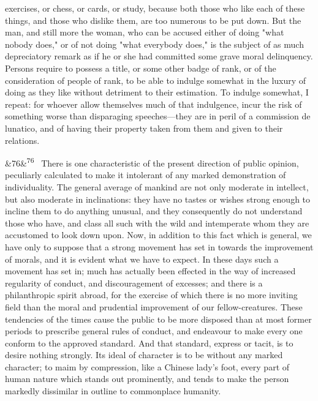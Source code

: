 \documentclass[12pt]{article}
\newcommand{\para}[1][]{\par\noindent\ifx&#1&\else\textsuperscript{\footnotesize #1}~\fi}
\begin{document}
exercises, or chess, or cards, or study, because both those who like each of these things, and those who dislike them, are too numerous to be put down. But the man, and still more the woman, who can be accused either of doing "what nobody does," or of not doing "what everybody does," is the subject of as much depreciatory remark as if he or she had committed some grave moral delinquency. Persons require to possess a title, or some other badge of rank, or of the consideration of people of rank, to be able to indulge somewhat in the luxury of doing as they like without detriment to their estimation. To indulge somewhat, I repeat: for whoever allow themselves much of that indulgence, incur the risk of something worse than disparaging speeches---they are in peril of a commission de lunatico, and of having their property taken from them and given to their relations.

\para[76] There is one characteristic of the present direction of public opinion, peculiarly calculated to make it intolerant of any marked demonstration of individuality. The general average of mankind are not only moderate in intellect, but also moderate in inclinations: they have no tastes or wishes strong enough to incline them to do anything unusual, and they consequently do not understand those who have, and class all such with the wild and intemperate whom they are accustomed to look down upon. Now, in addition to this fact which is general, we have only to suppose that a strong movement has set in towards the improvement of morals, and it is evident what we have to expect. In these days such a movement has set in; much has actually been effected in the way of increased regularity of conduct, and discouragement of excesses; and there is a philanthropic spirit abroad, for the exercise of which there is no more inviting field than the moral and prudential improvement of our fellow-creatures. These tendencies of the times cause the public to be more disposed than at most former periods to prescribe general rules of conduct, and endeavour to make every one conform to the approved standard. And that standard, express or tacit, is to desire nothing strongly. Its ideal of character is to be without any marked character; to maim by compression, like a Chinese lady's foot, every part of human nature which stands out prominently, and tends to make the person markedly dissimilar in outline to commonplace humanity.
\end{document}
